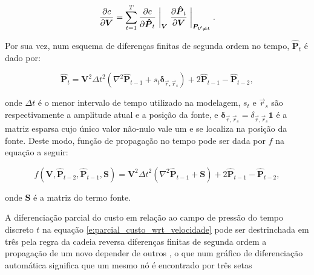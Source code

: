   \begin{equation} \label{e:parcial_custo_wrt_velocidade}
    \frac{\partial c}{\partial \boldsymbol{V}} =
      \sum \limits_{t=1}^T
      \frac{\partial c}{\partial \boldsymbol{\hat{P}}_t} \biggm\lvert_{\boldsymbol{V}}
      \frac{\partial \boldsymbol{\hat{P}}_t}{\partial \boldsymbol{V}} \biggm\lvert_{\boldsymbol{P_{t'\ne t}}}
    .
  \end{equation}

  Por sua vez, num esquema de diferenças finitas de segunda ordem no tempo, $\boldsymbol{\hat{P}}_t$ é dado por:

  \begin{equation} \label{e:fdm_rnn_cell}
    \boldsymbol{\hat{P}}_t =
      \boldsymbol{V}^2 {\Delta t}^2
      (\nabla^2 \boldsymbol{\hat{P}}_{t-1} + s_{t} \boldsymbol{\delta}_{\vec{r}, \vec{r}_s}) +
      2 \boldsymbol{\hat{P}}_{t-1} - 
      \boldsymbol{\hat{P}}_{t-2}
    ,
  \end{equation}

  \noindent onde $\Delta t$ é o menor intervalo de tempo utilizado na modelagem, $s_t$ e $\vec{r}_s$ são respectivamente a amplitude atual e a posição da fonte, e $\boldsymbol{\delta}_{\vec{r}, \vec{r}_s} = \delta_{\vec{r}, \vec{r}_s} \boldsymbol{1}$ é a matriz esparsa cujo único valor não-nulo vale um e se localiza na posição da fonte. Deste modo, função de propagação no tempo pode ser dada por $f$ na equação a seguir:

  \begin{equation} \label{e:fdm_rnn_cell_funcao}
    f(\boldsymbol{V}, \boldsymbol{\hat{P}}_{t-2}, \boldsymbol{\hat{P}}_{t-1}, \boldsymbol{S}) =
      \boldsymbol{V}^2 {\Delta t}^2
      (\nabla^2 \boldsymbol{\hat{P}}_{t-1} + \boldsymbol{S}) +
      2 \boldsymbol{\hat{P}}_{t-1} - 
      \boldsymbol{\hat{P}}_{t-2}
    ,
  \end{equation}

  \noindent onde $\boldsymbol{S}$ é a matriz do termo fonte.

  A diferenciação parcial do custo em relação ao campo de pressão do tempo discreto $t$ na equação \ref{e:parcial_custo_wrt_velocidade} pode ser destrinchada em três \DIFdelbegin {}\DIFdelend \DIFaddbegin {}\DIFaddend pela regra da cadeia reversa \DIFdelbegin {}\DIFdelend \DIFaddbegin {}\DIFaddend diferenças finitas de segunda ordem \DIFdelbegin {}\DIFdelend \DIFaddbegin {}\DIFaddend a propagação de um novo \DIFdelbegin {}\DIFdelend \DIFaddbegin {}\DIFaddend depender de outros \DIFdelbegin {}\DIFdelend \DIFaddbegin {}\DIFaddend , o que num gráfico de diferenciação automática significa que um mesmo nó \DIFaddbegin {}\DIFaddend é encontrado por três setas\DIFdelbegin \DIFdel{:
}\DIFdelend \DIFaddbegin {}\DIFaddend 

